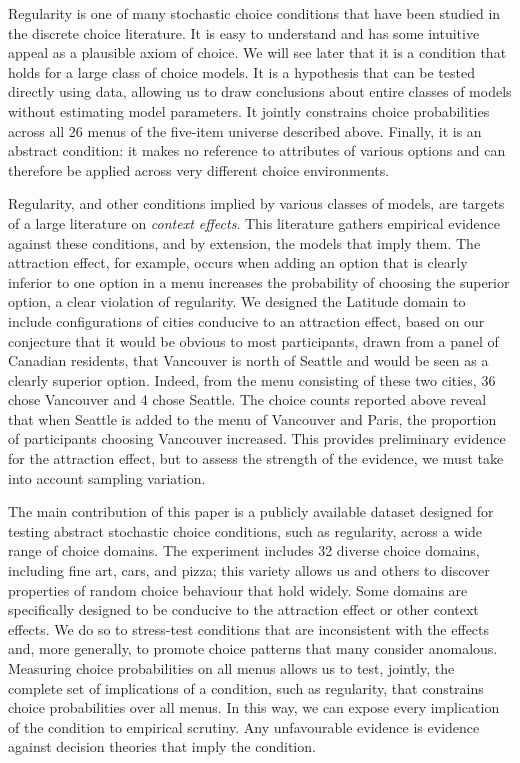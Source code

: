 \documentclass[11pt,letter]{article}
\newcommand{\menu}{menu}
\begin{document}
Regularity is one of many stochastic choice conditions that have been studied in the discrete choice literature.
It is easy to understand and has some intuitive appeal as a plausible axiom of choice.
We will see later that it is a condition that holds for a large class of choice models.
It is a hypothesis that can be tested directly using data, allowing us to draw conclusions about entire classes of models without estimating model parameters.
It jointly constrains choice probabilities across all 26 menus of the five-item universe described above.
Finally, it is an abstract condition: it makes no reference to attributes of various options and can therefore be applied across very different choice environments.

Regularity, and other conditions implied by various classes of models, are targets of a large literature on {\em context effects}.
This literature gathers empirical evidence against these conditions, and by extension, the models that imply them.
The attraction effect, for example, occurs when adding an option that is clearly inferior to one option in a menu increases the probability of choosing the superior option, a clear violation of regularity.
We designed the Latitude domain to include configurations of cities conducive to an attraction effect, based on our conjecture that it would be obvious to most participants, drawn from a panel of Canadian residents, that Vancouver is north of Seattle and would be seen as a clearly superior option.
Indeed, from the \menu{} consisting of these two cities, 36 chose Vancouver and 4 chose Seattle.
The choice counts reported above reveal that when Seattle is added to the menu of Vancouver and Paris, the proportion of participants choosing Vancouver increased.
This provides preliminary evidence for the attraction effect, but to assess the strength of the evidence, we must take into account sampling variation.

The main contribution of this paper is a publicly available dataset designed for testing abstract stochastic choice conditions, such as regularity, across a wide range of choice domains.
The experiment includes 32 diverse choice domains, including fine art, cars, and pizza; this variety allows us and others to discover properties of random choice behaviour that hold widely.
Some domains are specifically designed to be conducive to the attraction effect or other context effects.
We do so to stress-test conditions that are inconsistent with the effects and, more generally, to promote choice patterns that many consider anomalous.
Measuring choice probabilities on all menus allows us to test, jointly, the complete set of implications of a condition, such as regularity, that constrains choice probabilities over all menus.
In this way, we can expose every implication of the condition to empirical scrutiny.
Any unfavourable evidence is evidence against decision theories that imply the condition.
\end{document}
